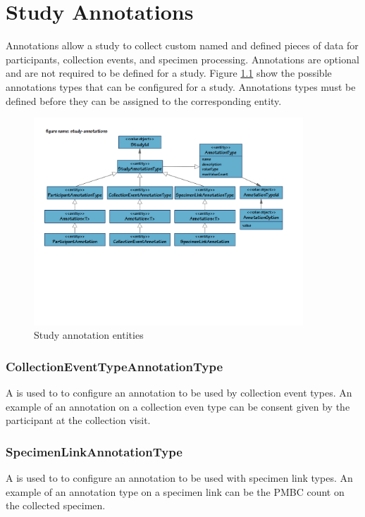 \chapter{Study Annotations}
\label{chap:study-annotations}
Annotations allow a study to collect custom named and defined pieces of data
for participants, collection events, and specimen processing.  Annotations are
optional and are not required to be defined for a study. Figure
\ref{fig:study-annotations} show the possible annotations types that can be
configured for a study. Annotations types must be defined before they can be
assigned to the corresponding entity.

\begin{figure}[H]
  \centering
  \includegraphics[trim={9mm 82mm 20mm 18mm}, clip,
    width=0.9\textwidth]{images/study-annotations}
  \caption{Study annotation entities}
  \label{fig:study-annotations}
\end{figure}

\subsection*{CollectionEventTypeAnnotationType}
A  is used to to configure an
annotation to be used by collection event types. An example of an annotation on
a collection even type can be consent given by the participant at the
collection visit.

\subsection*{SpecimenLinkAnnotationType}
A  is used to to configure an annotation to be used with
specimen link types. An example of an annotation type on a specimen link can be the PMBC count on
the collected specimen.


